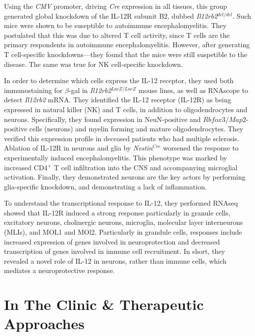 Using the \textit{CMV} promoter, driving \textit{Cre} expression in all tissues, this group generated global knockdown of the IL-12R subunit B2, dubbed \textit{Il12rb2}$^{del/del}$. Such mice were shown to be suseptible to autoimmune encephalomyelitis. They postulated that this was due to altered T cell activity, since T cells are the primary respondents in autoimmune encephalomyelitis. However, after generating T cell-specific knockdowns---they found that the mice were still suspetible to the disease. The same was true for NK cell-specific knockdown.\newline

In order to determine which cells express the IL-12 receptor, they used both immunostaining for $\beta$-gal in \textit{Il12rb2}$^{LacZ/LacZ}$ mouse lines, as well as RNAscope to detect \textit{Il12rb2} mRNA. They identified the IL-12 receptor (IL-12R) as being expressed in natural killer (NK) and T cells, in addition to oligodendrocytes and neurons. Specifically, they found expression in NeuN-positive and $Rbfox3/Map2$-positive cells (neurons) and myelin forming and mature oligodendrocytes. They verified this expression profile in deceased patients who had multiple sclerosis. Ablation of IL-12R in neurons and glia by \textit{Nestin}$^{Cre}$ worsened the response to experimentally induced encephalomyelitis. This phenotype was marked by increased CD4$^+$ T cell infiltration into the CNS and accompanying microglial activation. Finally, they demonstrated neurons are the key actors by performing glia-specific knockdown, and demonstrating a lack of inflammation. \newline

To understand the transcriptional response to IL-12, they performed RNAseq showed that IL-12R induced a strong response particularly in granule cells, excitatory neurons, cholinergic neurons, microglia, molecular layer interneurons (MLIs), and MOL1 and MOl2. Particularly in grandule cells, responses include increased expression of genes involved in neuroprotection and decreased transcription of genes involved in immune cell recruitment. In short, they revealed a novel role of IL-12 in neurons, rather than immune cells, which mediates a neuroprotective response. 



\chapter{In The Clinic \& Therapeutic Approaches}


